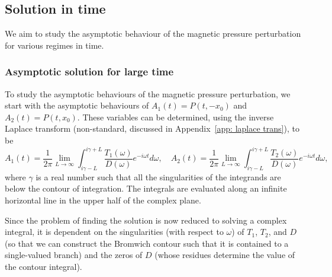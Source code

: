 \documentclass{aastex61}
\begin{document}
\subsection{Solution in time}
We aim to study the asymptotic behaviour of the magnetic pressure perturbation for various regimes in time.

\subsubsection{Asymptotic solution for large time}
To study the asymptotic behaviours of the magnetic pressure perturbation, we start with the asymptotic behaviours of $A_1(t) = P(t, -x_0)$ and $A_2(t) = P(t, x_0)$. These variables can be determined, using the inverse Laplace transform (non-standard, discussed in Appendix~\ref{app: laplace trans}), to be
\begin{equation}
A_1(t) = \frac{1}{2\pi} \lim_{L \to \infty} \int_{i\gamma - L}^{i\gamma + L} \frac{T_1(\omega)}{D(\omega)} e^{-i\omega t} d\omega, \quad A_2(t) = \frac{1}{2\pi} \lim_{L \to \infty} \int_{i\gamma - L}^{i\gamma + L} \frac{T_2(\omega)}{D(\omega)} e^{-i\omega t} d\omega,
\label{A inv laplace}
\end{equation}
where $\gamma$ is a real number such that all the singularities of the integrands are below the contour of integration. The integrals are evaluated along an infinite horizontal line in the upper half of the complex plane.

Since the problem of finding the solution is now reduced to solving a complex integral, it is dependent on the singularities (with respect to $\omega$) of $T_1$, $T_2$, and $D$ (so that we can construct the Bromwich contour such that it is contained to a single-valued branch) and the zeros of $D$ (whose residues determine the value of the contour integral).
\end{document}
